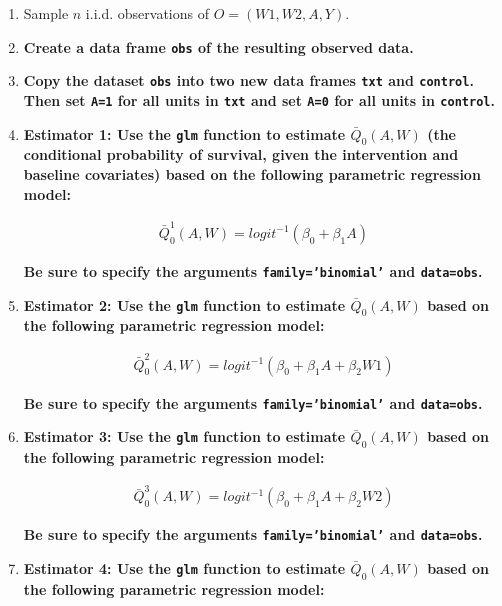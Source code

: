 \documentclass{article}\usepackage[]{graphicx}\usepackage[]{xcolor}
\begin{document}
  \begin{enumerate}[label=\textbf{\alph*.}]
  
    \item Sample $n$ i.i.d. observations of $O = (W1,W2,A,Y)$.
    
    \item \textbf{Create a data frame \texttt{obs} of the resulting observed data.}
    
    \item \textbf{Copy the dataset \texttt{obs} into two new data frames \texttt{txt} and \texttt{control}. Then set \texttt{A=1} for all units in \texttt{txt} and set \texttt{A=0} for all units in \texttt{control}.}
    
    \item \textbf{Estimator 1: Use the \texttt{glm} function to estimate $\bar{Q}_0(A,W)$ (the conditional probability of survival, given the intervention and baseline covariates) based on the following parametric regression model:}
    
\begin{align*}
\bar{Q}^1_0(A,W)=logit^{-1}(\beta_0+\beta_1A)
\end{align*}

\textbf{Be sure to specify the arguments \texttt{family='binomial'} and \texttt{data=obs}.}

    \item \textbf{Estimator 2: Use the \texttt{glm} function to estimate $\bar{Q}_0(A,W)$ based on the following parametric regression model:}
    
\begin{align*}
\bar{Q}^2_0(A,W)=logit^{-1}(\beta_0+\beta_1A+\beta_2W1)
\end{align*}

\textbf{Be sure to specify the arguments \texttt{family='binomial'} and \texttt{data=obs}.}

    \item \textbf{Estimator 3: Use the \texttt{glm} function to estimate $\bar{Q}_0(A,W)$ based on the following parametric regression model:}
    
\begin{align*}
\bar{Q}^3_0(A,W)=logit^{-1}(\beta_0+\beta_1A+\beta_2W2)
\end{align*}

\textbf{Be sure to specify the arguments \texttt{family='binomial'} and \texttt{data=obs}.}
    
    \item \textbf{Estimator 4: Use the \texttt{glm} function to estimate $\bar{Q}_0(A,W)$ based on the following parametric regression model:}
    

\end{enumerate}
\end{document}
